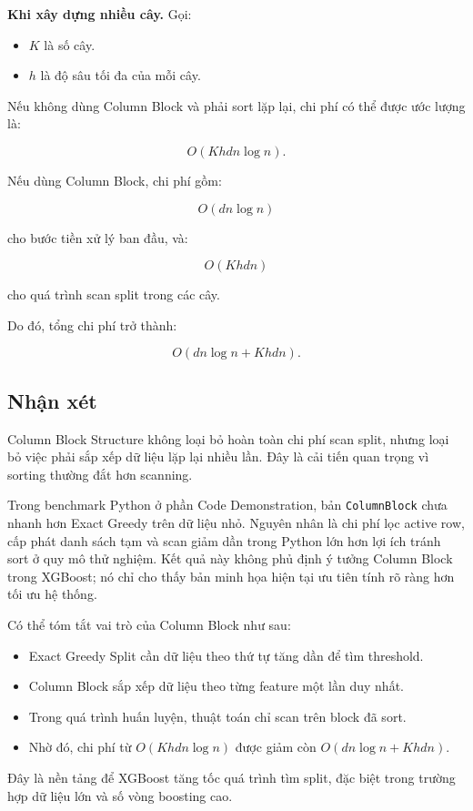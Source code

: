 \textbf{Khi xây dựng nhiều cây.} Gọi:

\begin{itemize}
    \item $K$ là số cây.
    \item $h$ là độ sâu tối đa của mỗi cây.
\end{itemize}

Nếu không dùng Column Block và phải sort lặp lại, chi phí có thể được ước lượng là:

\[
O(Khdn\log n).
\]

Nếu dùng Column Block, chi phí gồm:

\[
O(dn\log n)
\]

cho bước tiền xử lý ban đầu, và:

\[
O(Khdn)
\]

cho quá trình scan split trong các cây.

Do đó, tổng chi phí trở thành:

\[
O(dn\log n + Khdn).
\]

\subsection{Nhận xét}

Column Block Structure không loại bỏ hoàn toàn chi phí scan split, nhưng loại bỏ việc phải sắp xếp dữ liệu lặp lại nhiều lần. Đây là cải tiến quan trọng vì sorting thường đắt hơn scanning.

Trong benchmark Python ở phần Code Demonstration, bản \texttt{ColumnBlock} chưa nhanh hơn Exact Greedy trên dữ liệu nhỏ. Nguyên nhân là chi phí lọc active row, cấp phát danh sách tạm và scan giảm dần trong Python lớn hơn lợi ích tránh sort ở quy mô thử nghiệm. Kết quả này không phủ định ý tưởng Column Block trong XGBoost; nó chỉ cho thấy bản minh họa hiện tại ưu tiên tính rõ ràng hơn tối ưu hệ thống.

Có thể tóm tắt vai trò của Column Block như sau:

\begin{itemize}
    \item Exact Greedy Split cần dữ liệu theo thứ tự tăng dần để tìm threshold.
    \item Column Block sắp xếp dữ liệu theo từng feature một lần duy nhất.
    \item Trong quá trình huấn luyện, thuật toán chỉ scan trên block đã sort.
    \item Nhờ đó, chi phí từ $O(Khdn\log n)$ được giảm còn $O(dn\log n + Khdn)$.
\end{itemize}

Đây là nền tảng để XGBoost tăng tốc quá trình tìm split, đặc biệt trong trường hợp dữ liệu lớn và số vòng boosting cao.
